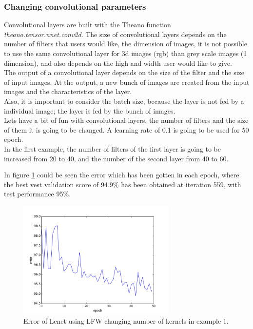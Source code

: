 \subsubsection{Changing convolutional parameters}
Convolutional layers are built with the Theano function \textit{theano.tensor.nnet.conv2d}. The size of convolutional layers depends on the number of filters that users would like, the dimension of images, it is not possible to use the same convolutional layer for 3d images (rgb) than grey scale images (1 dimension), and also depends on the high and width user would like to give.\\

The output of a convolutional layer depends on the size of the filter and the size of input images. At the output, a new bunch of images are created from the input images and the characteristics of the layer.\\

Also, it is important to consider the batch size, because the layer is not fed by a individual image; the layer is fed by the bunch of images.\\

Lets have a bit of fun with convolutional layers, the number of filters and the size of them it is going to be changed. A learning rate of 0.1 is going to be used for 50 epoch.\\

In the first example, the number of filters of the first layer is going to be increased from 20 to 40, and the number of the second layer from 40 to 60.

In figure \ref{fig:LENETLFW_ker1} could be seen the error which has been gotten in each epoch, where the best vest validation score of 94.9\% has been obtained at iteration 559, with test performance 95\%.

\begin{figure}[htb]
\centering
\includegraphics[width=0.7\textwidth]{images/LFW_layers/error_conv_40_60.png}
\caption{Error of Lenet using LFW changing number of kernels in example 1.} \label{fig:LENETLFW_ker1}
\end{figure}

